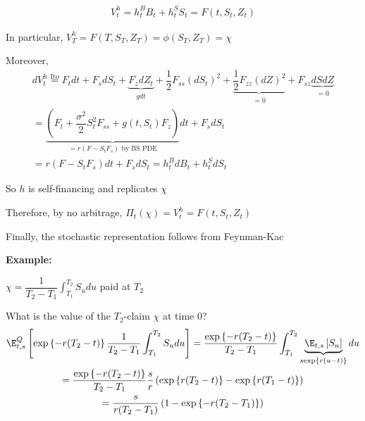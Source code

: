 \par\bigskip
\begin{prf}[]{}
  \begin{equation*}
    \begin{gathered}
      V_t^h = h_t^BB_t+h_t^SS_t = F(t,S_t,Z_t)
    \end{gathered}
  \end{equation*}\par
  \noindent In particular, $V_T^h = F(T,S_T,Z_T) = \phi(S_T,Z_T) = \chi$\par
  \noindent Moreover, 
  \begin{equation*}
    \begin{gathered}
      dV_t^h\stackrel{\text{Ito}}{=} F_tdt+F_sdS_t+\underbrace{F_zdZ_t}_{\substack{gdt}}+\dfrac{1}{2}F_{ss}(dS_t)^2 + \underbrace{\dfrac{1}{2}F_{zz}(dZ)^2}_{\substack{=0}}+ F_{sz}\underbrace{dSdZ}_{\substack{=0}}\\
      = \underbrace{\left(F_t+\dfrac{\sigma^2}{2}S_t^2F_{ss}+g(t,S_t)F_z\right)}_{=r(F-S_tF_s)\text{ by BS PDE}}dt+F_sdS_t\\
      = r(F-S_tF_s)dt + F_sdS_t = h_t^BdB_t+h_t^SdS_t
    \end{gathered}
  \end{equation*}\par
  \noindent So $h$ is self-financing and replicates $\chi$\par
  \noindent Therefore, by no arbitrage, $\Pi_t(\chi) = V_t^h = F(t,S_t,Z_t)$\par
  \noindent Finally, the stochastic representation follows from Feynman-Kac
\end{prf}
\par\bigskip
\noindent\textbf{Example:}\par
\noindent $\chi = \dfrac{1}{T_2-T_1}\int_{T_1}^{T_2}S_udu$ paid at $T_2$\par
\noindent What is the value of the $T_2$-claim $\chi$ at time 0?
\begin{equation*}
  \begin{gathered}
    \E_{t,s}^Q\left[\text{exp}\left\{-r(T_2-t)\right\}\dfrac{1}{T_2-T_1}\int_{T_1}^{T_2}S_udu\right] = \dfrac{\text{exp}\left\{-r(T_2-t)\right\}}{T_2-T_1}\int_{T_1}^{T_2}\underbrace{\E_{t,s}\left[S_u\right]}_{s\text{exp}\left\{r(u-t)\right\}}du\\
    = \dfrac{\text{exp}\left\{-r(T_2-t)\right\}}{T_2-T_1}\dfrac{s}{r}\left(\text{exp}\left\{r(T_2-t)\right\}-\text{exp}\left\{r(T_1-t)\right\}\right)\\
    = \dfrac{s}{r(T_2-T_1)}\left(1-\text{exp}\left\{-r(T_2-T_1)\right\}\right)
  \end{gathered}
\end{equation*}\par

